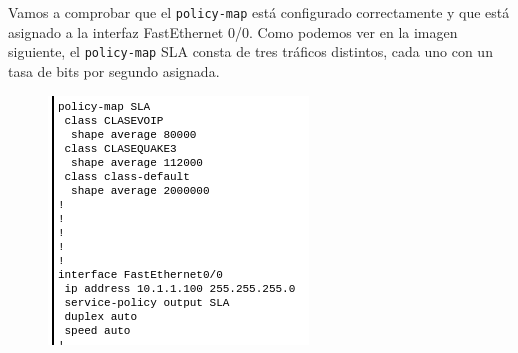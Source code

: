 \documentclass[11pt,a4paper]{article}
\begin{document}
Vamos a comprobar que el \texttt{policy-map} está configurado correctamente y que está asignado a la interfaz FastEthernet 0/0. Como podemos ver en la imagen siguiente, el \texttt{policy-map} SLA consta de tres tráficos distintos, cada uno con un tasa de bits por segundo asignada.

\begin{figure}[H]
	\centering
	\includegraphics[scale=0.7]{img/policy-map-ej5.png}
\end{figure}
\end{document}
